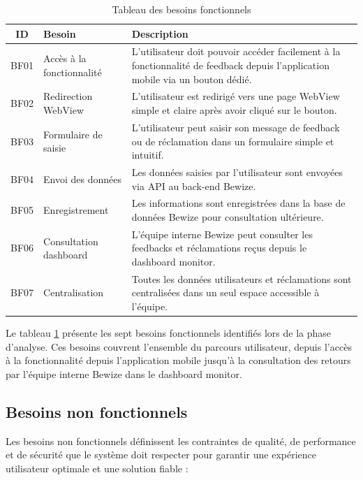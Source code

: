 \begin{table}[H]
\centering
\caption{Tableau des besoins fonctionnels}
\label{tab:besoins_fonctionnels}
\renewcommand{\arraystretch}{1.8}
\begin{tabular}{|c|p{4cm}|p{7cm}|}
\hline
\textbf{ID} & \textbf{Besoin} & \textbf{Description} \\
\hline
BF01 & Accès à la fonctionnalité & L'utilisateur doit pouvoir accéder 
facilement à la fonctionnalité de feedback depuis l'application mobile 
via un bouton dédié. \\
\hline
BF02 & Redirection WebView & L'utilisateur est redirigé vers une page 
WebView simple et claire après avoir cliqué sur le bouton. \\
\hline
BF03 & Formulaire de saisie & L'utilisateur peut saisir son message de 
feedback ou de réclamation dans un formulaire simple et intuitif. \\
\hline
BF04 & Envoi des données & Les données saisies par l'utilisateur sont 
envoyées via API au back-end Bewize. \\
\hline
BF05 & Enregistrement & Les informations sont enregistrées dans la base 
de données Bewize pour consultation ultérieure. \\
\hline
BF06 & Consultation dashboard & L'équipe interne Bewize peut consulter 
les feedbacks et réclamations reçus depuis le dashboard monitor. \\
\hline
BF07 & Centralisation & Toutes les données utilisateurs et réclamations 
sont centralisées dans un seul espace accessible à l'équipe. \\
\hline
\end{tabular}
\end{table}

Le tableau \ref{tab:besoins_fonctionnels} présente les sept besoins 
fonctionnels identifiés lors de la phase d'analyse. Ces besoins couvrent 
l'ensemble du parcours utilisateur, depuis l'accès à la fonctionnalité 
depuis l'application mobile jusqu'à la consultation des retours par 
l'équipe interne Bewize dans le dashboard monitor.

\subsection{Besoins non fonctionnels}
Les besoins non fonctionnels définissent les contraintes de qualité, 
de performance et de sécurité que le système doit respecter pour 
garantir une expérience utilisateur optimale et une solution fiable :

